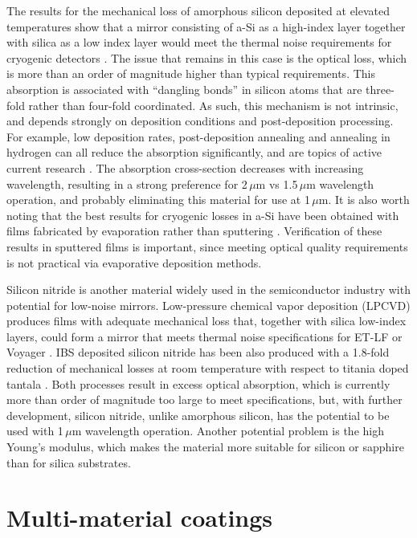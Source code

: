 \noindent The results for the mechanical loss of amorphous silicon deposited at elevated temperatures show that a mirror consisting of a-Si as a high-index layer together with silica as a low index layer would meet the thermal noise requirements for cryogenic detectors \cite{steinlechner2018silicon}. The issue that remains in this case is the optical loss, which is more than an order of magnitude higher than typical requirements. This absorption is associated with ``dangling bonds'' in silicon atoms that are three-fold rather than four-fold coordinated. As such, this mechanism is not intrinsic, and depends strongly on deposition conditions and post-deposition processing. For example, low deposition rates, post-deposition annealing and annealing in hydrogen can all reduce the absorption significantly, and are topics of active current research \cite{birney2018amorphous}. The absorption cross-section decreases with increasing wavelength, resulting in a strong preference for 2\,$\mu$m vs 1.5\,$\mu$m wavelength operation, and probably eliminating this material for use at 1\,$\mu$m. It is also worth noting that the best results for cryogenic losses in a-Si have been obtained with films fabricated by evaporation rather than sputtering \cite{liu2014hydrogen}. Verification of these results in sputtered films is important, since meeting optical quality requirements is not practical via evaporative deposition methods.

Silicon nitride is another material widely used in the semiconductor industry with potential for low-noise mirrors. Low-pressure chemical vapor deposition (LPCVD) produces films with adequate mechanical loss that, together with silica low-index layers, could form a mirror that meets thermal noise specifications for ET-LF or Voyager \cite{pan2018silicon}. IBS deposited silicon nitride has been also produced with a 1.8-fold reduction of mechanical losses at room temperature with respect to titania doped tantala \cite{pan2018silicon}. Both processes result in excess optical absorption, which is currently more than order of magnitude too large to meet specifications, but, with further development, silicon nitride, unlike amorphous silicon, has the potential to be used with 1\,$\mu$m wavelength operation. Another potential problem is the high Young's modulus, which makes the material more suitable for silicon or sapphire than for silica substrates.

\section{Multi-material coatings}

